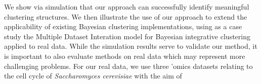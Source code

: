 \documentclass{bmcart}
\begin{document}
We show via simulation that our approach can successfully identify meaningful clustering structures. %
We then illustrate the use of our approach to extend the applicability of existing Bayesian clustering implementations, using as a case study the Multiple Dataset Interation \citep[\textbf{MDI};][]{kirk2012bayesian} model for Bayesian integrative clustering applied to real data. While the simulation results serve to validate our method, it is important to also evaluate methods on real data which may represent more challenging problems. For our real data, we use three 'omics datasets relating to the cell cycle of \emph{Saccharomyces cerevisiae} with the aim of   
\end{document}
